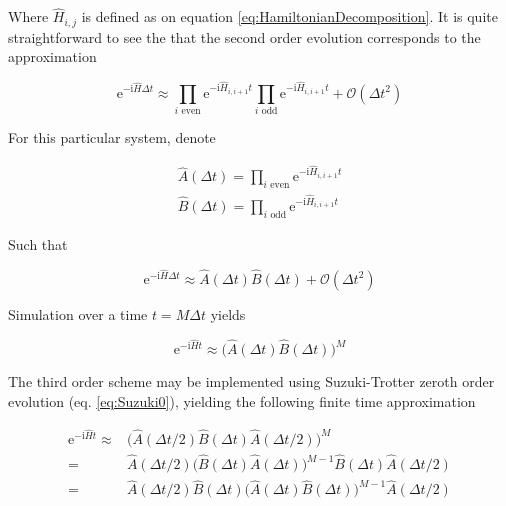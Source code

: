   Where $\hat{H}_{i,j}$ is defined as on equation \ref{eq:HamiltonianDecomposition}. It is quite straightforward to see the that the second order evolution corresponds to the approximation

  \begin{equation}
    \mathrm{e}^{-\mathrm{i}\hat{H}\Delta t} \approx \prod_{i \text{ even}} \mathrm{e}^{-\mathrm{i}\hat{H}_{i,i+1}t} \prod_{i \text{ odd}} \mathrm{e}^{-\mathrm{i}\hat{H}_{i,i+1}t} + \mathcal{O}(\Delta t^2)
    \label{eq:HamiltonianTrotterization}
  \end{equation}

  For this particular system, denote

  \begin{gather}
    \hat{A}(\Delta t) = \prod_{i \text{ even}} \mathrm{e}^{-\mathrm{i}\hat{H}_{i,i+1}t} \\
    \hat{B}(\Delta t) = \prod_{i \text{ odd}} \mathrm{e}^{-\mathrm{i}\hat{H}_{i,i+1}t}
    \label{eq:ChainOpsTrotter}
  \end{gather}

  Such that

  \begin{equation}
    \mathrm{e}^{-\mathrm{i}\hat{H}\Delta t} \approx \hat{A}(\Delta t) \hat{B}(\Delta t) + \mathcal{O}(\Delta t^2)
    \label{eq:HamiltonianTrotterization}
  \end{equation}

  Simulation over a time $t = M \Delta t$ yields

  \begin{equation}
    \mathrm{e}^{-\mathrm{i}\hat{H}t} \approx \bigg( \hat{A}(\Delta t) \hat{B}(\Delta t) \bigg)^{M}
    \label{eq:HamiltonianTrotterization}
  \end{equation}

  The third order scheme may be implemented using Suzuki-Trotter zeroth order evolution (eq. \ref{eq:Suzuki0}), yielding the following finite time approximation

  \begin{equation}
    \begin{aligned}
      \mathrm{e}^{-\mathrm{i}\hat{H}t} \approx & \bigg( \hat{A}(\Delta t/2) \hat{B}(\Delta t) \hat{A}(\Delta t/2) \bigg)^{M} \\
    = &  \hat{A}(\Delta t/2) \bigg( \hat{B}(\Delta t) \hat{A}(\Delta t) \bigg)^{M-1} \hat{B}(\Delta t) \hat{A}(\Delta t/2) \\
    = & \hat{A}(\Delta t/2) \hat{B}(\Delta t) \bigg( \hat{A}(\Delta t) \hat{B}(\Delta t) \bigg)^{M-1} \hat{A}(\Delta t/2)
    \label{eq:HamiltonianTrotterization}
    \end{aligned}
  \end{equation}

